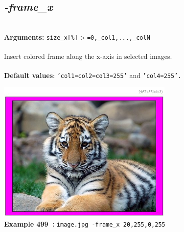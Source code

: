 \documentclass[a4paper,11pt,twoside]{book}
\begin{document}
\subsection{\emph{-frame\_x} }\vspace*{-0.5em}
~\\\textbf{Arguments: } 
{\small \texttt{size\_x[\%]$>$=0,\_col1,...,\_colN}}\\~\\
Insert colored frame along the x-axis in selected images.
~\\~\\\textbf{Default values}: {\small \texttt{'col1=col2=col3=255'} and \texttt{'col4=255'.}}
\begin{center}\includegraphics[keepaspectratio=true,height=7cm,width=\textwidth]{img/gmic_def499.jpg}\\
{\footnotesize \textbf{Example 499~:} \texttt{image.jpg -frame\_x 20,255,0,255}}
\end{center}
\end{document}
